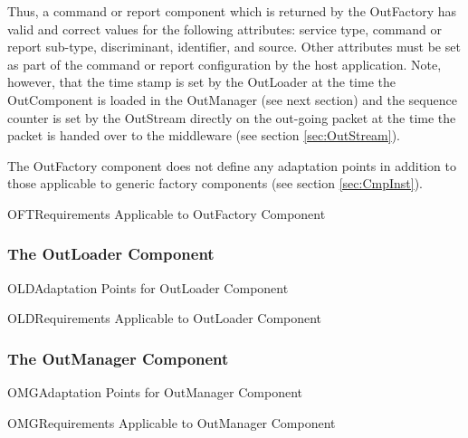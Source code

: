 \documentclass{pnp_article}
\begin{document}
Thus, a command or report component which is returned by the OutFactory has valid and correct values for the following attributes: service type, command or report sub-type,  discriminant,  identifier, and source. Other attributes must be set as part of the command or report configuration by the host application. Note, however, that the time stamp is set by the OutLoader at the time the OutComponent is loaded in the OutManager (see next section) and the sequence counter is set by the OutStream directly on the out-going packet at the time the packet is handed over to the middleware (see section \ref{sec:OutStream}).

The OutFactory component does not define any adaptation points in addition to those applicable to generic factory components (see section \ref{sec:CmpInst}). 

\begin{crReq}{OFT}{Requirements Applicable to OutFactory Component}
\end{crReq}

\subsubsection{The OutLoader Component}\label{sec:OutLoader}


\begin{crAp}{OLD}{Adaptation Points for OutLoader Component}
\end{crAp}

\begin{crReq}{OLD}{Requirements Applicable to OutLoader Component}
\end{crReq}

\newpage
\subsubsection{The OutManager Component}\label{sec:OutManager}


\begin{crAp}{OMG}{Adaptation Points for OutManager Component}
\end{crAp}

\begin{crReq}{OMG}{Requirements Applicable to OutManager Component}
\end{crReq}
\end{document}
